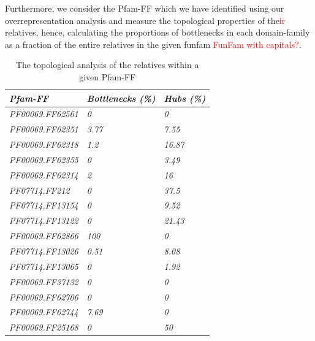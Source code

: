 \documentclass[a4paper, 11pt]{article}
\newcommand{\redinsert}[1]{\textcolor{red}{#1}} %
\begin{document}
Furthermore, we consider the Pfam-FF which we have identified using our overrepresentation analysis and measure the topological properties of the\redinsert{ir} relatives, hence, calculating the proportions of bottlenecks in each domain-family as a fraction of the entire relatives in the given funfam \redinsert{FunFam with capitals?}.

\begin{table}[H]
\fontsize{8}{8}\selectfont
\centering
\caption{The topological analysis of the relatives within a given Pfam-FF}
\label{Pfam-topology}
\begin{tabular}{|l|l|l|}
\hline
\textit{Pfam-FF}         & \textit{Bottlenecks (\%)} & \textit{Hubs (\%)} \\ \hline
\textit{PF00069.FF62561} & \textit{0}                & \textit{0}         \\ \hline
\textit{PF00069.FF62351} & \textit{3.77}             & \textit{7.55}      \\ \hline
\textit{PF00069.FF62318} & \textit{1.2}              & \textit{16.87}     \\ \hline
\textit{PF00069.FF62355} & \textit{0}                & \textit{3.49}      \\ \hline
\textit{PF00069.FF62314} & \textit{2}                & \textit{16}        \\ \hline
\textit{PF07714.FF212}   & \textit{0}                & \textit{37.5}      \\ \hline
\textit{PF07714.FF13154} & \textit{0}                & \textit{9.52}      \\ \hline
\textit{PF07714.FF13122} & \textit{0}                & \textit{21.43}     \\ \hline
\textit{PF00069.FF62866} & \textit{100}              & \textit{0}         \\ \hline
\textit{PF07714.FF13026} & \textit{0.51}             & \textit{8.08}      \\ \hline
\textit{PF07714.FF13065} & \textit{0}                & \textit{1.92}      \\ \hline
\textit{PF00069.FF37132} & \textit{0}                & \textit{0}         \\ \hline
\textit{PF00069.FF62706} & \textit{0}                & \textit{0}         \\ \hline
\textit{PF00069.FF62744} & \textit{7.69}             & \textit{0}         \\ \hline
\textit{PF00069.FF25168} & \textit{0}                & \textit{50}        \\ \hline

\end{tabular}
\end{table}
\end{document}
